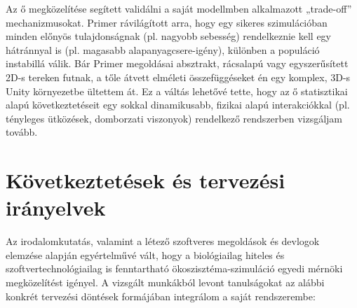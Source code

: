 Az ő megközelítése segített validálni a saját modellmben alkalmazott „trade-off” mechanizmusokat. Primer rávilágított arra, hogy egy sikeres szimulációban minden előnyös tulajdonságnak (pl. nagyobb sebesség) rendelkeznie kell egy hátránnyal is (pl. magasabb alapanyagcsere-igény), különben a populáció instabillá válik. Bár Primer megoldásai absztrakt, rácsalapú vagy egyszerűsített 2D-s tereken futnak, a tőle átvett elméleti összefüggéseket én egy komplex, 3D-s Unity környezetbe ültettem át. Ez a váltás lehetővé tette, hogy az ő statisztikai alapú következtetéseit egy sokkal dinamikusabb, fizikai alapú interakciókkal (pl. tényleges ütközések, domborzati viszonyok) rendelkező rendszerben vizsgáljam tovább.

\section{Következtetések és tervezési irányelvek}

Az irodalomkutatás, valamint a létező szoftveres megoldások és devlogok elemzése alapján egyértelművé vált, hogy a biológiailag hiteles és szoftvertechnológiailag is fenntartható ökoszisztéma-szimuláció egyedi mérnöki megközelítést igényel. A vizsgált munkákból levont tanulságokat az alábbi konkrét tervezési döntések formájában integrálom a saját rendszerembe:


